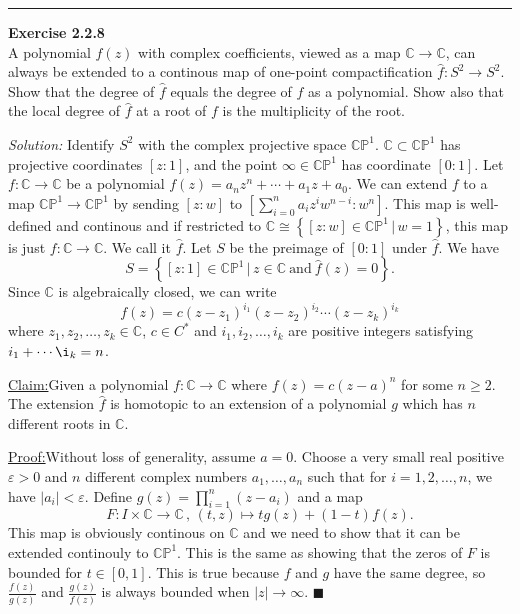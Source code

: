 \documentclass[a4paper, 12pt]{article}
\newenvironment{problem}[2][Exercise]
    { \begin{mdframed}[backgroundcolor=gray!20] \textbf{#1 #2} \\}
    {  \end{mdframed}}
\newenvironment{solution}
    {\textit{Solution:}}
    {}
\newenvironment{claim}[1]{\par\noindent\underline{Claim:}\space#1}{}
\newenvironment{claimproof}[1]{\par\noindent\underline{Proof:}\space#1}{\hfill $\blacksquare$}
\begin{document}
\noindent\rule{7in}{2.8pt}
\begin{problem}{2.2.8}
A polynomial \(f(z)\) with complex coefficients, viewed as a map \(\mathbb{C}\rightarrow \mathbb{C}\), can always be extended to a continous map of one-point compactification 
\(\hat{f}:S^2\rightarrow S^2\). Show that the degree of \(\hat{f}\) equals the degree of \(f\) as a polynomial. Show also that the local degree of \(\hat{f}\) at a root of \(f\) is the 
multiplicity of the root.
\end{problem}
\begin{solution}
Identify \(S^2\) with the complex projective space \(\mathbb{C}\mathbb{P}^1\). \(\mathbb{C}\subset \mathbb{C}\mathbb{P}^1\) has projective coordinates \([z:1]\), and the point \(\infty\in \mathbb{C}\mathbb{P}^1\) has coordinate 
\([0:1]\). Let \(f:\mathbb{C}\rightarrow \mathbb{C}\) be a polynomial \(f(z)=a_nz^n+\cdots+a_1z+a_0\). We can extend \(f\) to a map \(\mathbb{C} \mathbb{P}^1\rightarrow \mathbb{C} \mathbb{P}^1\) by sending \([z:w]\) to \([\sum_{i=0}^{n}a_iz^iw^{n-i}:w^n]\). This map 
is well-defined and continous and if restricted to \(\mathbb{C}\cong \left\{ [z:w]\in \mathbb{C}\mathbb{P}^1\,|\, w=1 \right\}\), this map is just \(f:\mathbb{C}\rightarrow \mathbb{C}\). We call it \(\hat{f}\).  Let \(S\) be the preimage 
of \([0:1]\) under \(\hat{f}\). We have 
\[S=\left\{ [z:1]\in \mathbb{C} \mathbb{P}^1\,|\, z\in \mathbb{C}\ \text{and}\ \hat{f}(z)=0 \right\}.\]
Since \(\mathbb{C}\) is algebraically closed, we can write 
\[f(z)=c(z-z_1)^{i_1}(z-z_2)^{i_2}\cdots(z-z_k)^{i_k}\]
where \(z_1,z_2,\ldots,z_k\in \mathbb{C}\), \(c\in C^*\) and \(i_1,i_2,\ldots,i_k\) are positive integers satisfying \(i_1+\cdots\i_k=n\). 

\begin{claim}
Given a polynomial \(f:\mathbb{C}\rightarrow \mathbb{C}\) where \(f(z)=c(z-a)^n\) for some \(n\geq 2\). The extension \(\hat{f}\) is homotopic to an extension of a polynomial \(g\) which has \(n\) different roots in \(\mathbb{C}\).
\end{claim}
\begin{claimproof}
Without loss of generality, assume \(a=0\). Choose a very small real positive \(\varepsilon>0\) and \(n\) different complex numbers \(a_1,\ldots,a_n\) such that for \(i=1,2,\ldots,n\), we have \(|a_i|<\varepsilon\). Define \(g(z)=\prod_{i=1}^{n}(z-a_i)\) and a map 
\[F:I\times \mathbb{C}\rightarrow \mathbb{C}\, ,\, (t,z)\mapsto tg(z)+(1-t)f(z).\]
This map is obviously continous on \(\mathbb{C}\) and we need to show that it can be extended continouly to \(\mathbb{C}\mathbb{P}^1\). This is the same as showing that the zeros of \(F\) is bounded for \(t\in [0,1]\). This is true because \(f\) and \(g\) have the same degree, so \(\frac{f(z)}{g(z)}\) and 
\(\frac{g(z)}{f(z)}\) is always bounded when \(|z|\to \infty\).
\end{claimproof}


\end{solution}
\end{document}
